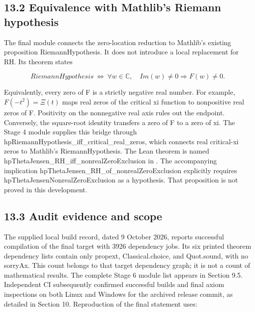 \documentclass[
  11pt,
]{article}
\begin{document}
\hypertarget{equivalence-with-mathlibs-riemann-hypothesis}{%
\subsection{13.2 Equivalence with Mathlib's Riemann hypothesis}\label{equivalence-with-mathlibs-riemann-hypothesis}}

The final module connects the zero-location reduction to Mathlib's existing proposition RiemannHypothesis. It does not introduce a local replacement for RH. Its theorem states

\[RiemannHypothesis\  \Leftrightarrow \ \forall w \in \mathbb{C},\quad Im(w) \neq 0 \Rightarrow F(w) \neq 0.\]

Equivalently, every zero of F is a strictly negative real number. For example, \(F\left( - t^{2} \right) = \Xi(t)\) maps real zeros of the critical xi function to nonpositive real zeros of F. Positivity on the nonnegative real axis rules out the endpoint. Conversely, the square-root identity transfers a zero of F to a zero of xi. The Stage 4 module  supplies this bridge through hpRiemannHypothesis\_iff\_critical\_real\_zeros, which connects real critical-xi zeros to Mathlib's RiemannHypothesis. The Lean theorem is named hpThetaJensen\_RH\_iff\_nonrealZeroExclusion in . The accompanying implication hpThetaJensen\_RH\_of\_nonrealZeroExclusion explicitly requires hpThetaJensenNonrealZeroExclusion as a hypothesis. That proposition is not proved in this development.

\hypertarget{audit-evidence-and-scope}{%
\subsection{13.3 Audit evidence and scope}\label{audit-evidence-and-scope}}

The supplied local build record, dated 9 October 2026, reports successful compilation of the final target with 3926 dependency jobs. Its six printed theorem dependency lists contain only propext, Classical.choice, and Quot.sound, with no sorryAx. This count belongs to that target dependency graph; it is not a count of mathematical results. The complete Stage 6 module list appears in Section 9.5. Independent CI subsequently confirmed successful builds and final axiom inspections on both Linux and Windows for the archived release commit, as detailed in Section 10. Reproduction of the final statement uses:
\end{document}
